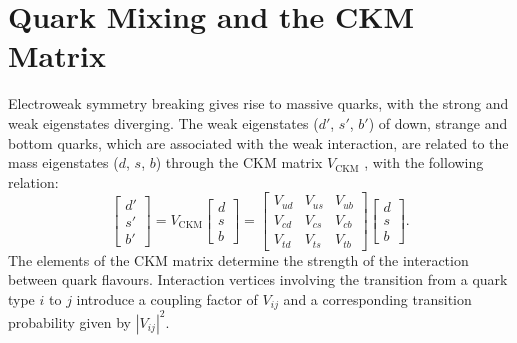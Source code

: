 \documentclass[../main.tex]{subfiles}
\begin{document}
    \section{Quark Mixing and the CKM Matrix}
    Electroweak symmetry breaking gives rise to massive quarks, with the strong and weak eigenstates diverging. The weak eigenstates ($d'$, $s'$, $b'$) of down, strange and bottom quarks, which are associated with the weak interaction, are related to the mass
    eigenstates ($d$, $s$, $b$) through the \gls{CKM} matrix $V_{\text{CKM}}$ \cite{PhysRevLett.10.531,10.1143/PTP.49.652}, with the following relation:
    \begin{equation}
    \begin{bmatrix} d' \\ s' \\ b' \end{bmatrix} =
        V_{\text{CKM}}
        \begin{bmatrix} d \\ s \\ b \end{bmatrix} = 
        \begin{bmatrix} 
            V_{ud} & V_{us} & V_{ub} \\ 
            V_{cd} & V_{cs} & V_{cb} \\ 
            V_{td} & V_{ts} & V_{tb} 
        \end{bmatrix}
        \begin{bmatrix} d \\ s \\ b \end{bmatrix}.
    \end{equation}
    The elements of the CKM matrix determine the strength of the interaction between quark flavours. Interaction vertices involving the transition from a quark type $i$ to $j$ introduce a coupling factor of $V_{ij}$ and a corresponding transition probability given by $|V_{ij}|^2$.
\end{document}
